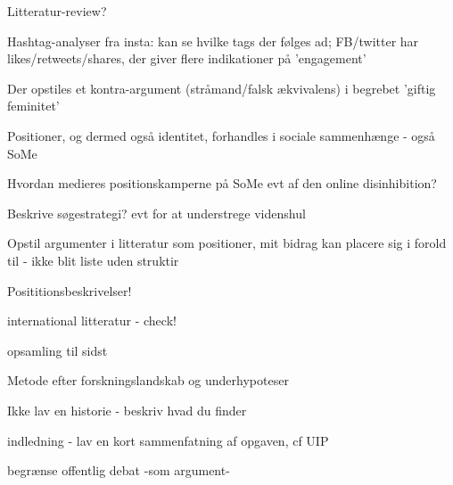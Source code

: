 Litteratur-review?

Hashtag-analyser fra insta: kan se hvilke tags der følges ad;
FB/twitter har likes/retweets/shares, der giver flere indikationer
på 'engagement'

Der opstiles et kontra-argument (stråmand/falsk ækvivalens) i
begrebet 'giftig feminitet'

Positioner, og dermed også identitet, forhandles i sociale
sammenhænge - også SoMe 

Hvordan medieres positionskamperne på SoMe evt af den online
disinhibition?

Beskrive søgestrategi? evt for at understrege videnshul

Opstil argumenter i litteratur som positioner, mit bidrag kan
placere sig i forold til - ikke blit liste uden struktir

Posititionsbeskrivelser!

international litteratur - check! 

opsamling til sidst

Metode efter forskningslandskab og underhypoteser

Ikke lav en historie - beskriv hvad du finder

indledning - lav en kort sammenfatning af opgaven, cf UIP

begrænse offentlig debat -som argument-
